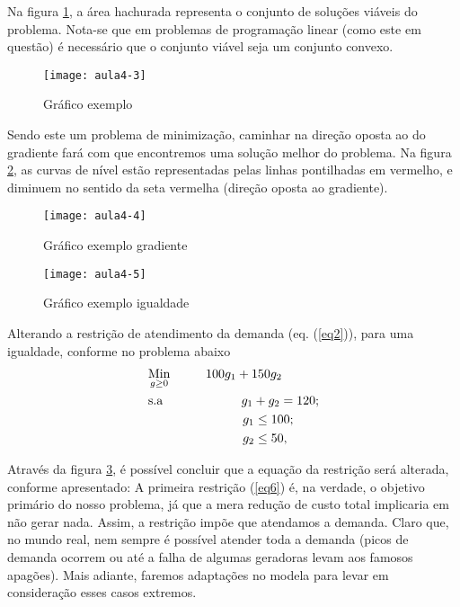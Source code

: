 \begin{exemplo}
Na figura \ref{fig:aula4-3}, a área hachurada representa o conjunto de soluções viáveis do problema. Nota-se que em problemas de programação linear (como este em questão) é necessário que o conjunto viável seja um conjunto convexo.
\begin{figure}[H]
\begin{centering}
\texttt{[image: aula4-3]}\protect\caption{\label{fig:aula4-3} Gráfico exemplo }
\end{centering}
\end{figure}
\end{exemplo}



Sendo este um problema de minimização, caminhar na direção oposta ao do gradiente fará com que encontremos uma solução melhor do problema. Na figura \ref{fig:aula4-4}, as curvas de nível estão representadas pelas linhas pontilhadas em vermelho, e diminuem no sentido da seta vermelha (direção oposta ao gradiente).

\begin{figure}[H]
\begin{centering}
\texttt{[image: aula4-4]}\protect\caption{\label{fig:aula4-4} Gráfico exemplo gradiente }
\end{centering}
\end{figure}

\begin{figure}[H]
\begin{centering}
\texttt{[image: aula4-5]}\protect\caption{\label{fig:aula4-5} Gráfico exemplo igualdade}
\end{centering}
\end{figure}

Alterando a restrição de atendimento da demanda (eq. (\ref{eq2})), para uma igualdade, conforme no problema abaixo
\begin{align}
    & \underset{g\geq0}{\text{Min}} \hspace{1cm} 100g_1+150g_2 \label{eq5} \\
    & \text{s.a}  \hspace{2.2cm} g_1+g_2 = 120; \label{eq6} \\
    &             \hspace{2.65cm} g_1\leq 100; \label{eq7}\\
    &             \hspace{2.65cm} g_2\leq 50, \label{eq8}
\end{align}

Através da figura \ref{fig:aula4-5}, é possível concluir que a equação da restrição será alterada, conforme apresentado:
A primeira restrição (\ref{eq6}) é, na verdade, o objetivo primário do nosso problema, já que a mera redução de custo total implicaria em não gerar nada. Assim, a restrição impõe que atendamos a demanda. Claro que, no mundo real, nem sempre é possível atender toda a demanda (picos de demanda ocorrem ou até a falha de algumas geradoras levam aos famosos apagões). Mais adiante, faremos adaptações no modela para levar em consideração esses casos extremos.

